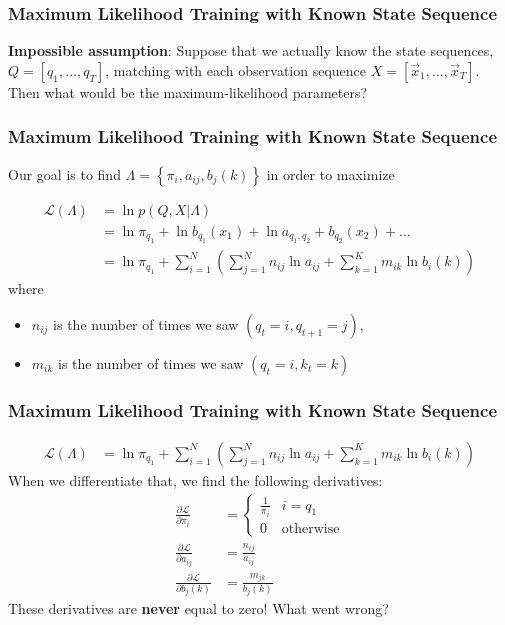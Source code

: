 \documentclass{beamer}
\begin{document}
\begin{frame}
  \frametitle{Maximum Likelihood Training with Known State Sequence}

  {\bf Impossible assumption}: Suppose that we actually know the state
  sequences, $Q=[q_1,\ldots,q_T]$, matching with each observation
  sequence $X=[\vec{x}_1,\ldots,\vec{x}_T]$.  Then what would be the
  maximum-likelihood parameters?

\end{frame}

\begin{frame}
  \frametitle{Maximum Likelihood Training with Known State Sequence}

  Our goal is to find $\Lambda=\left\{\pi_i,a_{ij},b_j(k)\right\}$ in
  order to maximize

  \begin{align*}
    {\mathcal L}(\Lambda) &= \ln p(Q,X|\Lambda)\\
    &= \ln \pi_{q_1} + \ln b_{q_1}(x_1) + \ln a_{q_1,q_2} + b_{q_2}(x_2) + \ldots\\
    &= \ln\pi_{q_1} + \sum_{i=1}^N\left(\sum_{j=1}^N n_{ij}\ln a_{ij} + \sum_{k=1}^Km_{ik}\ln b_i(k)\right)
  \end{align*}
  where
  \begin{itemize}
  \item $n_{ij}$ is the number of times we saw $(q_{t}=i,q_{t+1}=j)$,
  \item $m_{ik}$ is the number of times we saw $(q_t=i,k_t=k)$
  \end{itemize}
\end{frame}

\begin{frame}
  \frametitle{Maximum Likelihood Training with Known State Sequence}

  \begin{align*}
    {\mathcal L}(\Lambda) 
    &= \ln\pi_{q_1} + \sum_{i=1}^N\left(\sum_{j=1}^N n_{ij}\ln a_{ij} + \sum_{k=1}^Km_{ik}\ln b_i(k)\right)
  \end{align*}
  When we differentiate that, we find the following derivatives:
  \begin{align*}
    \frac{\partial\mathcal L}{\partial \pi_i} &= \begin{cases}
      \frac{1}{\pi_i}& i=q_1\\0& \mbox{otherwise}\end{cases}\\
    \frac{\partial\mathcal L}{\partial a_{ij}} &= \frac{n_{ij}}{a_{ij}}\\
    \frac{\partial\mathcal L}{\partial b_j(k)} &= \frac{m_{jk}}{b_{j}(k)}
  \end{align*}
  These derivatives are {\bf never} equal to zero!  What went wrong?
\end{frame}
\end{document}

